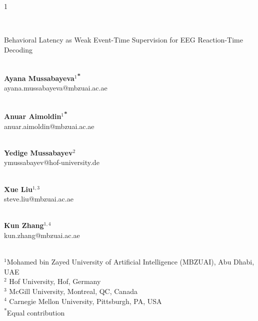 \documentclass[12pt]{article}
\begin{document}
\hspace{13.9cm}1

\ \vspace{20mm}\\

\begin{center}{\LARGE Behavioral Latency as Weak Event-Time Supervision for EEG Reaction-Time Decoding}
\end{center}

\ \\
{\bf \large Ayana Mussabayeva$^{1}$\textsuperscript{*}}\\
ayana.mussabayeva@mbzuai.ac.ae

\ \\ {\bf \large Anuar Aimoldin$^{1}$\textsuperscript{*}}\\
anuar.aimoldin@mbzuai.ac.ae




\ \\ {\bf \large Yedige Mussabayev$^{\displaystyle 2}$}\\
ymussabayev@hof-university.de

\ \\ {\bf \large Xue Liu$^{\displaystyle 1, 3}$}\\
steve.liu@mbzuai.ac.ae

\ \\ {\bf \large Kun Zhang$^{\displaystyle 1, 4}$}\\
kun.zhang@mbzuai.ac.ae


\ \\
{$^{\displaystyle 1}$Mohamed bin Zayed University of Artificial Intelligence (MBZUAI), Abu Dhabi, UAE}
\ \\
{$^{\displaystyle 2}$ Hof University, Hof, Germany}
\ \\
{$^{\displaystyle 3}$ McGill University, Montreal, QC, Canada}
\ \\
{$^{\displaystyle 4}$ Carnegie Mellon University, Pittsburgh, PA, USA}
\ \\
{\normalsize \textsuperscript{*}Equal contribution}\\
\end{document}
